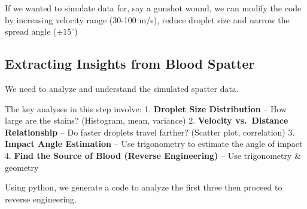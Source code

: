 \documentclass[11pt]{article}
\begin{document}
If we wanted to simulate data for, say a gunshot wound, we can modify
the code by increasing velocity range (30-100 m/s), reduce droplet size
and narrow the spread angle (\(\pm15^{\circ}\))

\subsection{Extracting Insights from Blood
Spatter}\label{extracting-insights-from-blood-spatter}

We need to analyze and understand the simulated spatter data.

The key analyses in this step involve: 1. \textbf{Droplet Size
Distribution} -- How large are the stains? (Histogram, mean, variance)
2. \textbf{Velocity vs.~Distance Relationship} -- Do faster droplets
travel farther? (Scatter plot, correlation) 3. \textbf{Impact Angle
Estimation} -- Use trigonometry to estimate the angle of impact 4.
\textbf{Find the Source of Blood (Reverse Engineering)} -- Use
trigonometry \& geometry

Using python, we generate a code to analyze the first three then proceed
to reverse engineering.
\end{document}
